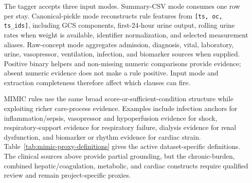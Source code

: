 The tagger accepts three input modes.  Summary-CSV mode consumes one row per stay.  Canonical-pickle mode reconstructs rule features from \texttt{[ts, oc, ts\_ids]}, including GCS components, first-24-hour urine output, rolling urine rates when weight is available, identifier normalization, and selected measurement aliases.  Raw-concept mode aggregates admission, diagnosis, vital, laboratory, urine, vasopressor, ventilation, infection, and biomarker sources when supplied.  Positive binary helpers and non-missing numeric comparisons provide evidence; absent numeric evidence does not make a rule positive.  Input mode and extraction completeness therefore affect which clauses can fire.

MIMIC rules use the same broad score-or-sufficient-condition structure while exploiting richer care-process evidence.  Examples include infection anchors for inflammation/sepsis, vasopressor and hypoperfusion evidence for shock, respiratory-support evidence for respiratory failure, dialysis evidence for renal dysfunction, and biomarker or rhythm evidence for cardiac strain.  Table~\ref{tab:mimic-proxy-definitions} gives the active dataset-specific definitions.  The clinical sources above provide partial grounding, but the chronic-burden, combined hepatic/coagulation, metabolic, and cardiac constructs require qualified review and remain project-specific proxies.


